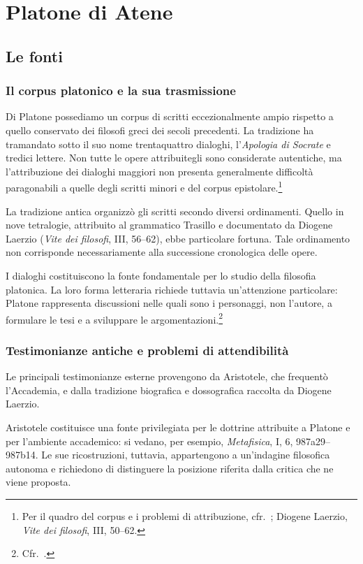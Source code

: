 \chapter{Platone di Atene}
\label{cap:platone:profilo}

\section{Le fonti}

\subsection{Il corpus platonico e la sua trasmissione}

Di Platone possediamo un corpus di scritti eccezionalmente ampio rispetto a quello conservato dei filosofi greci dei secoli precedenti. La tradizione ha tramandato sotto il suo nome trentaquattro dialoghi, l'\emph{Apologia di Socrate} e tredici lettere. Non tutte le opere attribuitegli sono considerate autentiche, ma l'attribuzione dei dialoghi maggiori non presenta generalmente difficoltà paragonabili a quelle degli scritti minori e del corpus epistolare.\footnote{Per il quadro del corpus e i problemi di attribuzione, cfr.\ \cite[95--96]{palumbo2015}; Diogene Laerzio, \emph{Vite dei filosofi}, III, 50--62.}

La tradizione antica organizzò gli scritti secondo diversi ordinamenti. Quello in nove tetralogie, attribuito al grammatico Trasillo e documentato da Diogene Laerzio (\emph{Vite dei filosofi}, III, 56--62), ebbe particolare fortuna. Tale ordinamento non corrisponde necessariamente alla successione cronologica delle opere.

I dialoghi costituiscono la fonte fondamentale per lo studio della filosofia platonica. La loro forma letteraria richiede tuttavia un'attenzione particolare: Platone rappresenta discussioni nelle quali sono i personaggi, non l'autore, a formulare le tesi e a sviluppare le argomentazioni.\footnote{Cfr.\ \cite[95--98]{palumbo2015}.}

\subsection{Testimonianze antiche e problemi di attendibilità}

Le principali testimonianze esterne provengono da Aristotele, che frequentò l'Accademia, e dalla tradizione biografica e dossografica raccolta da Diogene Laerzio.

Aristotele costituisce una fonte privilegiata per le dottrine attribuite a Platone e per l'ambiente accademico: si vedano, per esempio, \emph{Metafisica}, I, 6, 987a29--987b14. Le sue ricostruzioni, tuttavia, appartengono a un'indagine filosofica autonoma e richiedono di distinguere la posizione riferita dalla critica che ne viene proposta.


